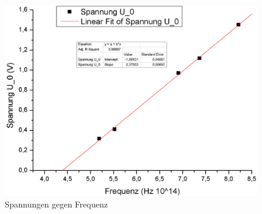 \documentclass[12pt,a4paper]{article}
\begin{document}
\begin{figure}[H]
	\centering
	\includegraphics[scale=0.45]{./data/U0_Plank.png}
	\caption{Spannungen gegen Frequenz}
	\label{fig:plank}
\end{figure}
\end{document}

